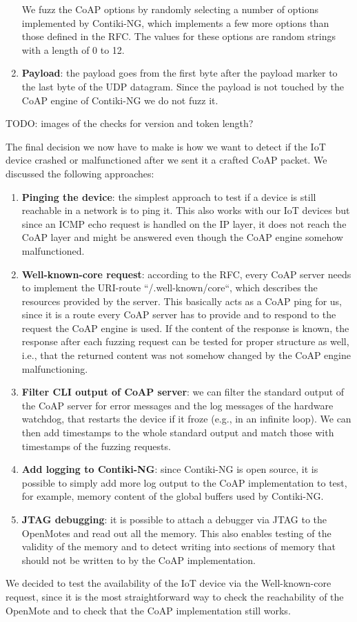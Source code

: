 \begin{enumerate}
	We fuzz the CoAP options by randomly selecting a number of options implemented by Contiki-NG, which implements a few more options than those defined in the RFC. The values for these options are random strings with a length of 0 to 12.
	\item \textbf{Payload}: the payload goes from the first byte after the payload marker to the last byte of the UDP datagram. Since the payload is not touched by the CoAP engine of Contiki-NG we do not fuzz it.
\end{enumerate}

TODO: images of the checks for version and token length?

The final decision we now have to make is how we want to detect if the IoT device crashed or malfunctioned after we sent it a crafted CoAP packet. We discussed the following approaches:
\begin{enumerate}
	\item \textbf{Pinging the device}: the simplest approach to test if a device is still reachable in a network is to ping it. This also works with our IoT devices but since an ICMP echo request is handled on the IP layer, it does not reach the CoAP layer and might be answered even though the CoAP engine somehow malfunctioned.
	\item \textbf{Well-known-core request}: according to the RFC, every CoAP server needs to implement the URI-route ``/.well-known/core``, which describes the resources provided by the server. This basically acts as a CoAP ping for us, since it is a route every CoAP server has to provide and to respond to the request the CoAP engine is used. If the content of the response is known, the response after each fuzzing request can be tested for proper structure as well, i.e., that the returned content was not somehow changed by the CoAP engine malfunctioning.
	\item \textbf{Filter CLI output of CoAP server}: we can filter the standard output of the CoAP server for error messages and the log messages of the hardware watchdog, that restarts the device if it froze (e.g., in an infinite loop). We can then add timestamps to the whole standard output and match those with timestamps of the fuzzing requests.
	\item \textbf{Add logging to Contiki-NG}: since Contiki-NG is open source, it is possible to simply add more log output to the CoAP implementation to test, for example, memory content of the global buffers used by Contiki-NG.
	\item \textbf{JTAG debugging}: it is possible to attach a debugger via JTAG to the OpenMotes and read out all the memory. This also enables testing of the validity of the memory and to detect writing into sections of memory that should not be written to by the CoAP implementation.
\end{enumerate}

We decided to test the availability of the IoT device via the Well-known-core request, since it is the most straightforward way to check the reachability of the OpenMote and to check that the CoAP implementation still works.
